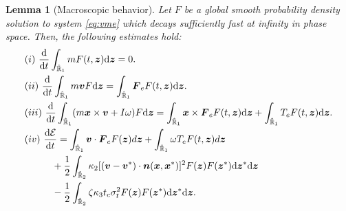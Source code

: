 \documentclass[a4paper,11pt]{article}
\numberwithin{equation}{section}
\newtheorem{lemma}[theorem]{Lemma}
\theoremstyle{definition}
\newcommand{\bfx}{\boldsymbol{x}}
\newcommand{\bfz}{\boldsymbol{z}}
\newcommand{\bfv}{\boldsymbol{v}}
\newcommand{\bfn}{\boldsymbol{n}}
\newcommand{\bfF}{\boldsymbol{F}}
\newcommand{\bbr}{\mathbb R}
\def\d{{  \rm d}}
\newcommand{\E}{\mathcal{E}}
\begin{document}
\begin{lemma}[Macroscopic behavior] \label{lem:kmb}
Let $F$ be a global smooth probability density solution to system \eqref{eq:vme} which decays sufficiently fast at infinity in phase space. Then, the following estimates hold:
\begin{align}
& (i)~  \frac{\d}{\d t} \int_{\hat{\bbr}_1} mF(t,\bfz) \d \bfz = 0. \nonumber \\
& (ii)~\frac{\d}{\d t} \int_{\hat{\bbr}_1}  m\bfv F \d \bfz 
=  \int_{\hat{\bbr}_1}  \bfF_e F(t, \bfz)  \d \bfz. \nonumber \\
& (iii)~\frac{\d}{\d t} \int_{\hat{\bbr}_1} (m\bfx\times \bfv +I \omega)F \d \bfz = \int_{\hat{\bbr}_1} \bfx \times \bfF_e F(t,\bfz)\d \bfz 
 +\int_{\hat{\bbr}_1} T_e F(t,\bfz)\d\bfz. \label{eq:kedt} \\ 
& (iv)~\frac{\d \E}{\d t} = \int_{\hat{\bbr}_1} \bfv \cdot  \bfF_e F(\bfz)  d \bfz  
 +  \int_{\hat{\bbr}_1}  \omega T_e  F(t, \bfz)  d \bfz \nonumber \\
& \hspace{1cm} + \frac{1}{2}  \int_{\hat{\bbr}_2}   \kappa_2 [ (\bfv  - \bfv^*) \cdot \bfn(\bfx, \bfx^*)]^2  F(\bfz) F(\bfz^*)\d\bfz^*\d\bfz \nonumber\\
&\hspace{1cm} -\frac12 \int_{\hat{\bbr}_2}  \zeta\kappa_3t_c \sigma_t^2  F(\bfz)  F(\bfz^*)\d\bfz^*\d\bfz. \nonumber
\end{align}
\end{lemma}
\end{document}
